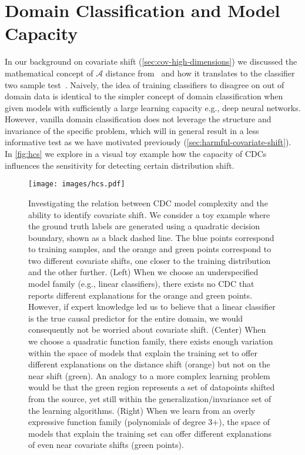 \section{Domain Classification and Model Capacity}\label{sec:relationship-with-learning theory}
In our background on covariate shift (\autoref{sec:cov-high-dimensions}) we discussed the mathematical concept of $\mathcal{A}$ distance from~\citep{atheory, domainrep}
and how it translates to the classifier two sample test~\citep{paz2017revisiting}.
Naively, the idea of training classifiers to disagree on out of domain data is identical to the simpler concept of domain classification when given models with sufficiently a large learning capacity e.g., deep neural networks.
However, vanilla domain classification does not leverage the structure and invariance of the specific problem, which will in general result in a less informative test as we have motivated previously (\autoref{sec:harmful-covariate-shift}).
In \autoref{fig:hcs} we explore in a visual toy example how the capacity of CDCs influences the sensitivity for detecting certain distribution shift.

\begin{figure}[!htb]
    \centering
    \texttt{[image: images/hcs.pdf]}
    \caption{\small Investigating the relation between CDC model complexity and the ability to identify covariate shift.
    We consider a toy example where the ground truth labels are generated using a quadratic decision boundary, shown as a black dashed line.
    The blue points correspond to training samples, and the orange and green points correspond to two different covariate shifts, one closer to the training distribution and the other further.
        (Left) When we choose an underspecified model family (e.g., linear classifiers), there exists no CDC that reports different explanations for the orange and green points.
        However, if expert knowledge led us to believe that a linear classifier is the true causal predictor for the entire domain, we would consequently not be worried about covariate shift.
        (Center) When we choose a quadratic function family, there exists enough variation within the space of models that explain the training set to offer different explanations on the distance shift (orange) but not on the near shift (green).
        An analogy to a more complex learning problem would be that the green region represents a set of datapoints shifted from the source, yet still within the generalization/invariance set of the learning algorithms.
        (Right) When we learn from an overly expressive function family (polynomials of degree 3+), the space of models that explain the training set can offer different explanations of even near covariate shifts (green points).}
    \label{fig:hcs}
\end{figure}

